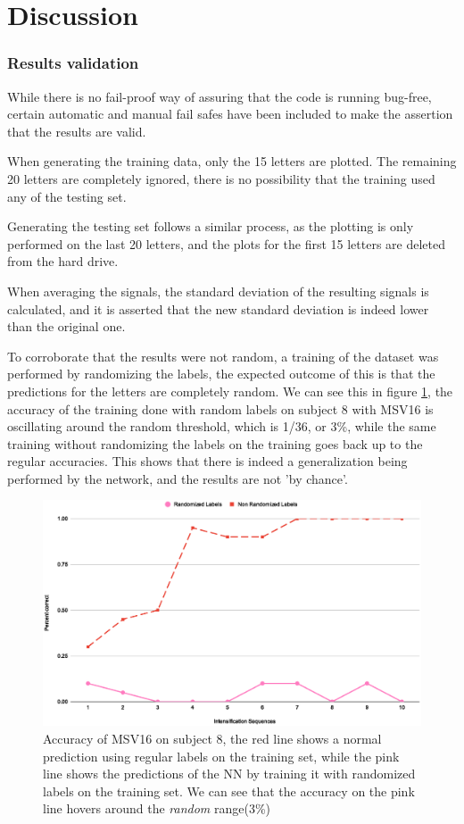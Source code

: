 \documentclass[conference]{IEEEtran}
\begin{document}
\section{Discussion}


\subsubsection{Results validation}
While there is no fail-proof way of assuring that the code is running bug-free, certain automatic and manual fail safes have been included to make the assertion that the results are valid.

When generating the training data, only the 15 letters are plotted. The remaining 20 letters are completely ignored, there is no possibility that the training used any of the testing set. 

Generating the testing set follows a similar process, as the plotting is only performed on the last 20 letters, and the plots for the first 15 letters are deleted from the hard drive.

When averaging the signals, the standard deviation of the resulting signals is calculated, and it is asserted that the new standard deviation is indeed lower than the original one.

To corroborate that the results were not random, a training of the dataset was performed by randomizing the labels, the expected outcome of this is that the predictions for the letters are completely random. We can see this in figure \ref{image:randomlabels}, the accuracy of the training done with random labels on subject 8 with MSV16 is oscillating around the random threshold, which is 1/36, or 3\%, while the same training without randomizing the labels on the training goes back up to the regular accuracies. This shows that there is indeed a generalization being performed by the network, and the results are not 'by chance'.

\begin{figure}[htb]
  \centering
  \includegraphics[width=\linewidth]{images/randomlabels.eps}
  \caption[Random Labels Accuracy]{Accuracy of MSV16 on subject 8, the red line shows a normal prediction using regular labels on the training set, while the pink line shows the predictions of the NN by training it with randomized labels on the training set. We can see that the accuracy on the pink line hovers around the \emph{random} range(3\%)}
  \label{image:randomlabels}
\end{figure}
\end{document}
